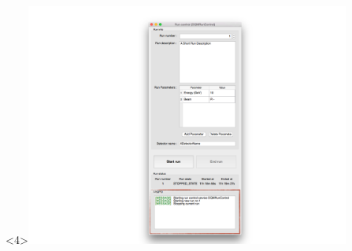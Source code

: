 \documentclass[8pt]{beamer}
\begin{document}
\begin{frame}
\begin{center}
\begin{overlayarea}{\textwidth}{\textheight}
\begin{center}
          \begin{onlyenv}<4>\includegraphics[width=0.8\textwidth]{figs/RunControl/RunControl_logging.png}\end{onlyenv}
        \end{center}
      \end{overlayarea}
    \end{center}
  \end{frame}
   
\end{document}
